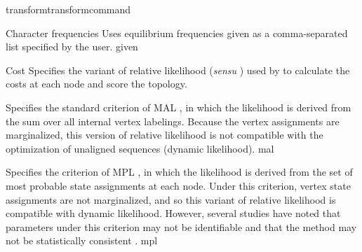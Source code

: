 \begin{command}{transform}{transformcommand}
\begin{arguments}
\begin{argumentgroup} {Character frequencies}
                            {Uses equilibrium frequencies given as a
                            comma-separated list specified by the user.} 
                            {given}

                    \end{argumentgroup}


	\begin {argumentgroup} {Cost}
	           Specifies the variant of relative likelihood (\textit{sensu}
                    \cite{steel2000parsimony}) used by \poy to calculate the costs at
                    each node and score the topology.

                            {Specifies the standard criterion of MAL \cite{felsenstein1981}, in which the
                            likelihood is derived from the sum over all internal
                            vertex labelings. Because the vertex assignments are
                            marginalized, this version of relative likelihood is not
                            compatible with the optimization of unaligned sequences (dynamic likelihood).}
                            {mal}

                            {Specifies the criterion of MPL \cite{barryandhartigan1987}, in which the likelihood is
                            derived from the set of most probable state assignments
                            at each node. Under this criterion, vertex state
                            assignments are not marginalized, and so this variant of
                            relative likelihood is compatible with dynamic
                            likelihood. However, several studies have noted that
                            parameters under this criterion may not be identifiable
                            \cite{zou2011} and that the method may not be statistically consistent
                            \cite{mossel2009shrinkage}.}
    			  {mpl}
		
		   \end{argumentgroup}
		   	  
                         

\end{arguments}
\end{command}
